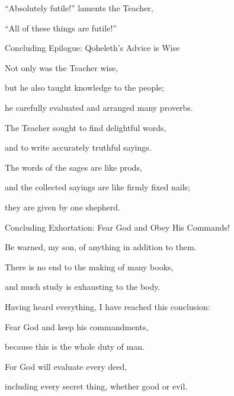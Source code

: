 {\par }{\Q {}“Absolutely
futile!” laments
the Teacher,
\par }{\Q “All
of these things are futile!”
\par }{\SH Concluding Epilogue: Qoheleth’s Advice is Wise
\par }{\Q {}Not only
was
the Teacher
wise,
\par }{\Q but he also
taught
knowledge
to the people;
\par }{\Q he carefully evaluated
and arranged
many
proverbs.
\par }{\Q {}The Teacher
sought
to find
delightful
words,
\par }{\Q and to write
accurately
truthful
sayings.
\par }{\Q {}The words
of the sages
are like prods,
\par }{\Q and the collected
sayings are like firmly
fixed nails;
\par }{\Q they are given
by one
shepherd.
\par }{\SH Concluding Exhortation: Fear God and Obey His Commands!
\par }{\Q {}Be
warned,
my son,
of anything in addition
to them.

\par }{\Q There is no
end
to the making
of many
books,
\par }{\Q and much
study
is exhausting
to the body.
\par }{\Q {}Having heard
everything,
I have reached this conclusion:

\par }{\Q Fear
God
and keep
his commandments,
\par }{\Q because
this
is the whole
duty of man.
\par }{\Q {}For
God
will evaluate
every
deed,
\par }{\PP including every
secret
thing, whether
good
or
evil.
\par }